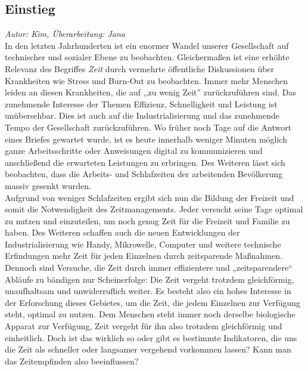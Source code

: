 \documentclass{Paper}
\begin{document}
\subsection{Einstieg}
\textit{Autor: Kim, Überarbeitung: Jana}\\
In den letzten Jahrhunderten ist ein enormer Wandel unserer Gesellschaft auf technischer und sozialer Ebene zu beobachten. Gleichermaßen ist eine erhöhte Relevanz des Begriffes \textit{Zeit} durch vermehrte öffentliche Diskussionen über Krankheiten wie Stress und Burn-Out zu beobachten. Immer mehr Menschen leiden an diesen Krankheiten, die auf ,,zu wenig Zeit'' zurückzuführen sind. Das zunehmende Interesse der Themen Effizienz, Schnelligkeit und Leistung ist unübersehbar. 
Dies ist auch auf die Industrialisierung und das zunehmende Tempo der Gesellschaft zurückzuführen. \cite{Wallisch2003} Wo früher noch Tage auf die Antwort eines Briefes gewartet wurde, ist es heute innerhalb weniger Minuten möglich ganze Arbeitsschritte oder Anweisungen digital zu kommunizieren und anschließend die erwarteten Leistungen zu erbringen.
Des Weiteren lässt sich beobachten, dass die Arbeits- und Schlafzeiten der arbeitenden Bevölkerung massiv gesenkt wurden. \cite{DeutscheSozialgeschichte}\\
Aufgrund von weniger Schlafzeiten ergibt sich nun die Bildung der Freizeit und somit die Notwendigkeit des Zeitmanagements. Jeder versucht seine Tage optimal zu nutzen und einzuteilen, um noch genug Zeit für die Freizeit und Familie zu haben. Des Weiteren schaffen auch die neuen Entwicklungen der Industrialisierung wie Handy, Mikrowelle, Computer und weitere technische Erfindungen mehr Zeit für jeden Einzelnen durch zeitsparende Maßnahmen. Dennoch sind Versuche, die Zeit durch immer effizientere und „zeitsparendere“ Abläufe zu bändigen nur Scheinerfolge: Die Zeit vergeht trotzdem gleichförmig, unaufhaltsam und unwiderruflich weiter. \cite{Wallisch2003} Es besteht also ein hohes Interesse in der Erforschung dieses Gebietes, um die Zeit, die jedem Einzelnen zur Verfügung steht, optimal zu nutzen.
Dem Menschen steht immer noch derselbe biologische Apparat zur Verfügung, Zeit vergeht für ihn also trotzdem gleichförmig und einheitlich. Doch ist das wirklich so oder gibt es bestimmte Indikatoren, die uns die Zeit als schneller oder langsamer vergehend vorkommen lassen? Kann man das Zeitempfinden also beeinflussen?
\end{document}
